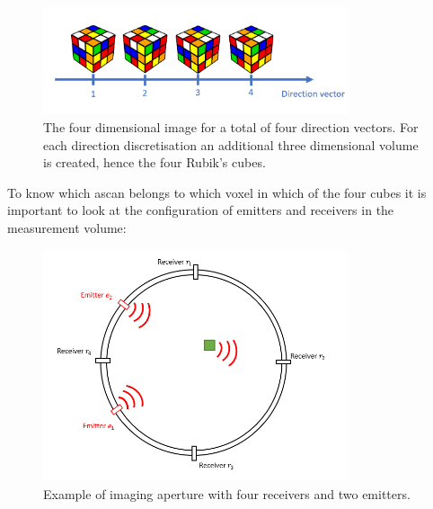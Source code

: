 \begin{figure}[H]
    \centering
    \includegraphics[width=0.8\textwidth]{Graphics/rubicscube4D.png}
    \caption{The four dimensional image for a total of four direction vectors. For each direction discretisation an additional three dimensional volume is created, hence the four Rubik's cubes.}
    \label{4D_rubics}
\end{figure}

To know which \ac{ascan} belongs to which voxel in which of the four cubes it is important to look at the  configuration of emitters and receivers in the measurement volume:

\begin{figure}[H]
    \centering
    \includegraphics[width=0.8\textwidth]{Graphics/problem_4D.png}
    \caption{Example of imaging aperture with four receivers and two emitters.}
    \label{4D_problem}
\end{figure}

